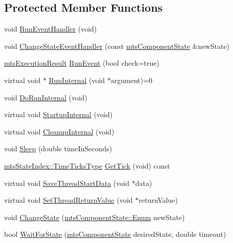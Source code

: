 \subsection*{Protected Member Functions}
\begin{DoxyCompactItemize}
\item 
void \hyperlink{classmts_task_a3ffb50ec20611c1372c1ef2fc7c252eb}{Run\+Event\+Handler} (void)
\item 
void \hyperlink{classmts_task_a8e7150ceb2934cc1b0d685f249c7c5c1}{Change\+State\+Event\+Handler} (const \hyperlink{classmts_component_state}{mts\+Component\+State} \&new\+State)
\item 
\hyperlink{classmts_execution_result}{mts\+Execution\+Result} \hyperlink{classmts_task_a6bc857ef1d6f98c90f55846e940e00c3}{Run\+Event} (bool check=true)
\item 
virtual void $\ast$ \hyperlink{classmts_task_affcd896841ecfe785f898ef93a4202e9}{Run\+Internal} (void $\ast$argument)=0
\item 
void \hyperlink{classmts_task_a4f73416a80c5a7601a5cf3fce0167da5}{Do\+Run\+Internal} (void)
\item 
virtual void \hyperlink{classmts_task_a6816f8dfc6124376896318ebcdd4832b}{Startup\+Internal} (void)
\item 
virtual void \hyperlink{classmts_task_aba518c256e0c623e1e826cc7c76fe8eb}{Cleanup\+Internal} (void)
\item 
void \hyperlink{classmts_task_acaccf2da6d6f8f26c65657656d572131}{Sleep} (double time\+In\+Seconds)
\item 
\hyperlink{classmts_state_index_a80d0a5acdec3b616347ddea2912b6294}{mts\+State\+Index\+::\+Time\+Ticks\+Type} \hyperlink{classmts_task_a6beb5091a65dd8c7b501701a72cd5057}{Get\+Tick} (void) const 
\item 
virtual void \hyperlink{classmts_task_a194fbc7a2dba85f02d80b85bf84ad26c}{Save\+Thread\+Start\+Data} (void $\ast$data)
\item 
virtual void \hyperlink{classmts_task_a89f212237d9b7e453c91df8a1a6962d2}{Set\+Thread\+Return\+Value} (void $\ast$return\+Value)
\item 
void \hyperlink{classmts_task_a320a9995ca33358c5c334862b6fdf7a2}{Change\+State} (\hyperlink{classmts_component_state_a1158e4d2d79fff671354909e87f58928}{mts\+Component\+State\+::\+Enum} new\+State)
\item 
bool \hyperlink{classmts_task_a2153a26a4a92583bae49696501da212e}{Wait\+For\+State} (\hyperlink{classmts_component_state}{mts\+Component\+State} desired\+State, double timeout)
\end{DoxyCompactItemize}
